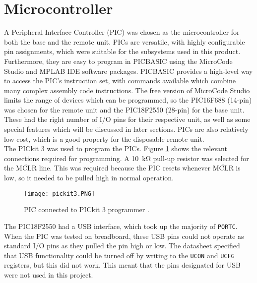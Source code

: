 \section{Microcontroller}
A Peripheral Interface Controller (PIC) was chosen as the microcontroller for both the base and the remote unit. PICs are versatile, with highly configurable pin assignments, which were suitable for the subsystems used in this product. Furthermore, they are easy to program in PICBASIC using the MicroCode Studio \cite{microcode_studio} and MPLAB IDE software packages. PICBASIC provides a high-level way to access the PIC's instruction set, with commands available which combine many complex assembly code instructions. The free version of MicroCode Studio limits the range of devices which can be programmed, so the PIC16F688 (14-pin) \cite{pic16f688} was chosen for the remote unit and the PIC18F2550 (28-pin) \cite{pic18f2550} for the base unit. These had the right number of I/O pins for their respective unit, as well as some special features which will be discussed in later sections. PICs are also relatively low-cost, which is a good property for the disposable remote unit.\\

The PICkit 3 \cite{pickit3} was used to program the PICs. Figure \ref{fig: pickit3} shows the relevant connections required for programming. A \SI{10}{\kilo\ohm} pull-up resistor was selected for the $\overline{\text{MCLR}}$ line. This was required because the PIC resets whenever $\overline{\text{MCLR}}$ is low, so it needed to be pulled high in normal operation. \\

\begin{figure}[ht]
	\centering
	\texttt{[image: pickit3.PNG]}
	\caption{PIC connected to PICkit 3 programmer \cite{pickit3}.}
	\label{fig: pickit3}
\end{figure}

The PIC18F2550 had a USB interface, which took up the majority of \verb|PORTC|. When the PIC was tested on breadboard, these USB pins could not operate as standard I/O pins as they pulled the pin high or low. The datasheet specified that USB functionality could be turned off by writing to the \verb|UCON| and \verb|UCFG| registers, but this did not work. This meant that the pins designated for USB were not used in this project.